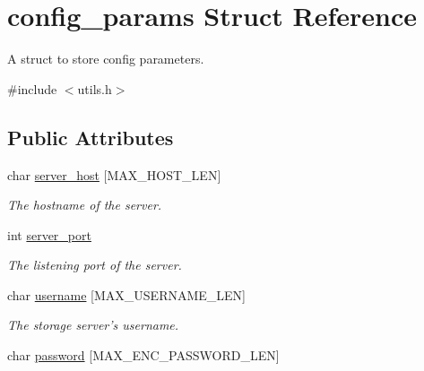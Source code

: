 \hypertarget{structconfig__params}{
\section{config\_\-params Struct Reference}
\label{structconfig__params}
}


A struct to store config parameters.  




{\ttfamily \#include $<$utils.h$>$}

\subsection*{Public Attributes}
\begin{DoxyCompactItemize}
\item 
\hypertarget{structconfig__params_a962b7bcdbee26333fa776115ed066fb3}{
char \hyperlink{structconfig__params_a962b7bcdbee26333fa776115ed066fb3}{server\_\-host} \mbox{[}MAX\_\-HOST\_\-LEN\mbox{]}}
\label{structconfig__params_a962b7bcdbee26333fa776115ed066fb3}

\begin{DoxyCompactList}\small\item\em The hostname of the server. \item\end{DoxyCompactList}\item 
\hypertarget{structconfig__params_aa7103926e2d35a5d3461a5081723bdcd}{
int \hyperlink{structconfig__params_aa7103926e2d35a5d3461a5081723bdcd}{server\_\-port}}
\label{structconfig__params_aa7103926e2d35a5d3461a5081723bdcd}

\begin{DoxyCompactList}\small\item\em The listening port of the server. \item\end{DoxyCompactList}\item 
\hypertarget{structconfig__params_a4793ceaa4b04decbe50ff4fa9fdde145}{
char \hyperlink{structconfig__params_a4793ceaa4b04decbe50ff4fa9fdde145}{username} \mbox{[}MAX\_\-USERNAME\_\-LEN\mbox{]}}
\label{structconfig__params_a4793ceaa4b04decbe50ff4fa9fdde145}

\begin{DoxyCompactList}\small\item\em The storage server's username. \item\end{DoxyCompactList}\item 
\hypertarget{structconfig__params_a287adb79846d3b33b2e2bdd0cd12f901}{
char \hyperlink{structconfig__params_a287adb79846d3b33b2e2bdd0cd12f901}{password} \mbox{[}MAX\_\-ENC\_\-PASSWORD\_\-LEN\mbox{]}}
\label{structconfig__params_a287adb79846d3b33b2e2bdd0cd12f901}


\end{DoxyCompactItemize}

